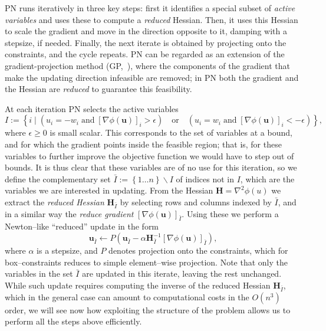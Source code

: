 \documentclass[twoside,11pt]{article}
\newcommand{\vu}{\bm{u}}       \newcommand{\vuh}{\hat{\bm{u}}}        \newcommand{\uh}{\hat{u}}    \newcommand{\vut}{\tilde{\bm{u}}}       \newcommand{\ut}{\tilde{u}}
\newcommand{\mH}{\bm{H}}
\newcommand{\set}[1]{\left\{ {#1}\right\}}
\numberwithin{equation}{section}
\numberwithin{theorem}{section}
\begin{document}
PN runs iteratively in three key steps: first it identifies a special subset of \emph{active variables} and uses these to compute a \emph{reduced} Hessian. Then, it uses this Hessian to scale the gradient and move in the direction opposite to it, damping with a  stepsize, if needed. Finally, the next iterate is obtained by projecting onto the constraints, and the cycle repeats. PN can be regarded as an extension of the gradient-projection method (GP,~\citet{Bertsekas}), where the components of the gradient that make the updating direction infeasible are removed; in PN both the gradient and the Hessian are \emph{reduced} to guarantee this feasibility.

At each iteration PN selects the active variables
\begin{equation}
  \label{eq.16}
  I := \set{i \mid (u_i = -w_i \;\text{and}\; [\nabla\phi(\vu)]_i > \epsilon)\quad\text{or}\quad (u_i = w_i \;\text{and}\; [\nabla\phi(\vu)]_i < -\epsilon)},
\end{equation}
where $\epsilon \ge 0$ is small scalar. This corresponds to the set of variables at a bound, and for which the gradient points inside the feasible region; that is, for these variables to further improve the objective function we would have to step out of bounds. It is thus clear that these variables are of no use for this iteration, so we define the complementary set $\bar{I} := \set{1\ldots n} \backslash I$ of indices not in $I$, which are the variables we are interested in updating. From the Hessian $\mH=\nabla^2\phi(u)$ we extract the \emph{reduced Hessian} $\mH_{\bar{I}}$ by selecting rows and columns indexed by $\bar{I}$, and in a similar way the \emph{reduce gradient} $[\nabla\phi(\vu)]_{\bar{I}}$. Using these we perform a Newton--like ``reduced'' update in the form
\begin{equation}
  \label{eq:6}
  \vu_{\bar{I}} \gets P(\vu_{\bar{I}} - \alpha\mH_{\bar{I}}^{-1}[\nabla\phi(\vu)]_{\bar{I}}),
\end{equation}
where $\alpha$ is a stepsize, and $P$ denotes projection onto the constraints, which for box--constraints reduces to simple element--wise projection. Note that only the variables in the set $\bar{I}$ are updated in this iterate, leaving the rest unchanged. While such update requires computing the inverse of the reduced Hessian $\mH_{\bar{I}}$, which in the general case can amount to computational costs in the $O(n^3)$ order, we will see now how exploiting the structure of the problem allows us to perform all the steps above efficiently.
\end{document}
